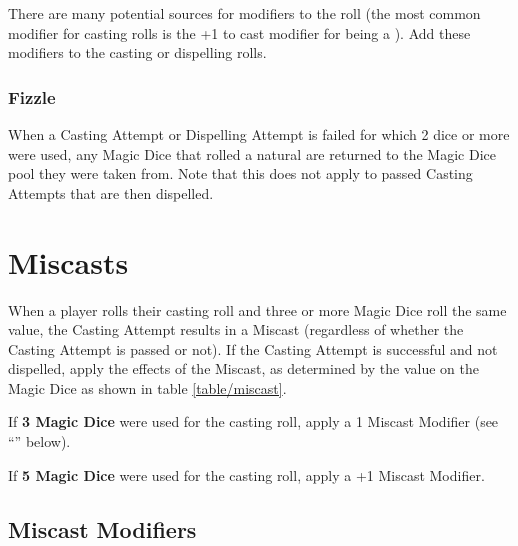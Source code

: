 There are many potential sources for modifiers to the roll (the most common modifier for casting rolls is the +1 to cast modifier for being a \wizardmaster{}). Add these modifiers to the casting or dispelling rolls.

\subsubsection{Fizzle}
\label{fizzle}

When a Casting Attempt or Dispelling Attempt is failed for which 2 dice or more were used, any Magic Dice that rolled a natural  are returned to the Magic Dice pool they were taken from. Note that this does not apply to passed Casting Attempts that are then dispelled.

\columnbreak

\section{Miscasts}
\label{miscast}

When a player rolls their casting roll and three or more Magic Dice roll the same value, the Casting Attempt results in a Miscast (regardless of whether the Casting Attempt is passed or not). If the Casting Attempt is successful and not dispelled, apply the effects of the Miscast, as determined by the value on the Magic Dice as shown in table \ref{table/miscast}.

If \textbf{3 Magic Dice} were used for the casting roll, apply a \minuss{}1 Miscast Modifier (see \enquote{} below).

If \textbf{5 Magic Dice} were used for the casting roll, apply a +1 Miscast Modifier.

\subsection{Miscast Modifiers}
\label{miscast_modifiers}

